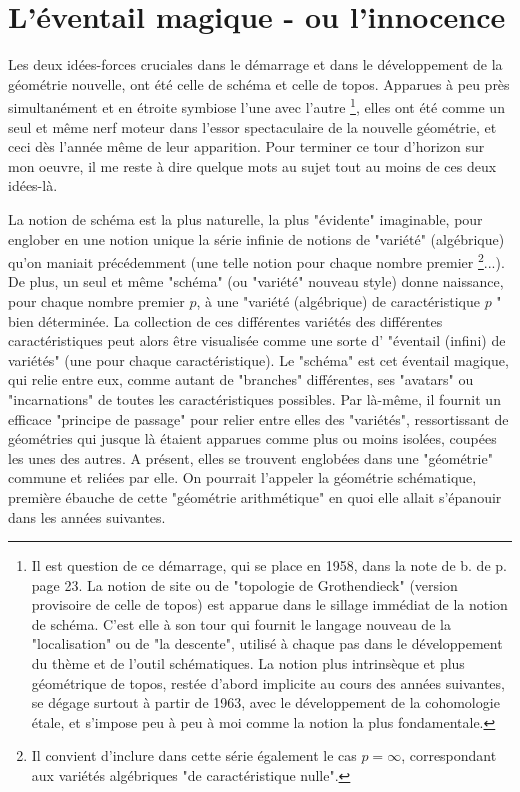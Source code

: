 \section{L'éventail magique - ou l'innocence}

Les deux idées-forces cruciales dans le démarrage et dans le développement de la géométrie nouvelle, ont été celle de schéma et celle de topos. Apparues à peu près simultanément et en étroite symbiose l'une avec l'autre \footnote{Il est question de ce démarrage, qui se place en 1958, dans la note de b. de p. page 23. La notion de site ou de "topologie de Grothendieck" (version provisoire de celle de topos) est apparue dans le sillage immédiat de la notion de schéma. C'est elle à son tour qui fournit le langage nouveau de la "localisation" ou de "la descente", utilisé à chaque pas dans le développement du thème et de l'outil schématiques. La notion plus intrinsèque et plus géométrique de topos, restée d'abord implicite au cours des années suivantes, se dégage surtout à partir de 1963, avec le développement de la cohomologie étale, et s'impose peu à peu à moi comme la notion la plus fondamentale.}, elles ont été comme un seul et même nerf moteur dans l'essor spectaculaire de la nouvelle géométrie, et ceci dès l'année même de leur apparition. Pour terminer ce tour d'horizon sur mon oeuvre, il me reste à dire quelque mots au sujet tout au moins de ces deux idées-là.

La notion de schéma est la plus naturelle, la plus "évidente" imaginable, pour englober en une notion unique la série infinie de notions de "variété" (algébrique) qu'on maniait précédemment (une telle notion pour chaque nombre premier \footnote{Il convient d'inclure dans cette série également le cas $p=\infty$, correspondant aux variétés algébriques "de caractéristique nulle".}...). De plus, un seul et même "schéma" (ou "variété" nouveau style) donne naissance, pour chaque nombre premier $p$, à une "variété (algébrique) de caractéristique $p$ " bien déterminée. La collection de ces différentes variétés des différentes caractéristiques peut alors être visualisée comme une sorte d' "éventail (infini) de variétés" (une pour chaque caractéristique). Le "schéma" est cet éventail magique, qui relie entre eux, comme autant de "branches" différentes, ses "avatars" ou "incarnations" de toutes les caractéristiques possibles. Par là-même, il fournit un efficace "principe de passage" pour relier entre elles des "variétés", ressortissant de géométries qui jusque là étaient apparues comme plus ou moins isolées, coupées les unes des autres. A présent, elles se trouvent englobées dans une "géométrie" commune et reliées par elle. On pourrait l'appeler la géométrie schématique, première ébauche de cette "géométrie arithmétique" en quoi elle allait s'épanouir dans les années suivantes.

